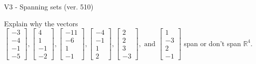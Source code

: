 \begin{exercise}
  \begin{exerciseTitle}V3 - Spanning sets (ver. 510)\end{exerciseTitle}
  \begin{exerciseStatement}
    Explain why the vectors \(\left[\begin{array}{r}
-3 \\
-4 \\
-1 \\
-5
\end{array}\right] , \left[\begin{array}{r}
4 \\
1 \\
-1 \\
-2
\end{array}\right] , \left[\begin{array}{r}
-11 \\
-6 \\
1 \\
-1
\end{array}\right] , \left[\begin{array}{r}
-4 \\
-1 \\
1 \\
2
\end{array}\right] , \left[\begin{array}{r}
2 \\
2 \\
3 \\
-3
\end{array}\right] , \text{ and } \left[\begin{array}{r}
1 \\
-3 \\
2 \\
-1
\end{array}\right]\) span or don't span \(\mathbb{R}^4\). 
	



\end{exerciseStatement}
\end{exercise}
